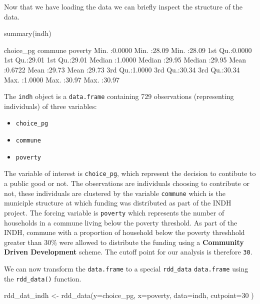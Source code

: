 \documentclass[article]{jss}
\begin{document}
Now that we have loading the data we can briefly inspect the structure
of the data.

\begin{CodeChunk}
\begin{CodeInput}
summary(indh)
\end{CodeInput}
\begin{CodeOutput}
   choice_pg         commune         poverty     
 Min.   :0.0000   Min.   :28.09   Min.   :28.09  
 1st Qu.:0.0000   1st Qu.:29.01   1st Qu.:29.01  
 Median :1.0000   Median :29.95   Median :29.95  
 Mean   :0.6722   Mean   :29.73   Mean   :29.73  
 3rd Qu.:1.0000   3rd Qu.:30.34   3rd Qu.:30.34  
 Max.   :1.0000   Max.   :30.97   Max.   :30.97  
\end{CodeOutput}
\end{CodeChunk}

The \texttt{indh} object is a \texttt{data.frame} containing 729
observations (representing individuals) of three variables:

\begin{itemize}
\itemsep1pt\parskip0pt
\item
  \texttt{choice\_pg}
\item
  \texttt{commune}
\item
  \texttt{poverty}
\end{itemize}

The variable of interest is \texttt{choice\_pg}, which represent the
decision to contibute to a public good or not. The observations are
individuals choosing to contribute or not, these individuals are
clustered by the variable \texttt{commune} which is the municiple
structure at which funding was distributed as part of the INDH project.
The forcing variable is \texttt{poverty} which represents the number of
households in a commune living below the poverty threshold. As part of
the INDH, commune with a proportion of household below the poverty
threshhold greater than 30\% were allowed to distribute the funding
using a \textbf{Community Driven Development} scheme. The cutoff point
for our analysis is therefore \texttt{30}.

We can now transform the \texttt{data.frame} to a special
\texttt{rdd\_data} \texttt{data.frame} using the \texttt{rdd\_data()}
function.

\begin{CodeChunk}
\begin{CodeInput}
rdd_dat_indh <- rdd_data(y=choice_pg,
                         x=poverty,
                         data=indh,
                         cutpoint=30 )
\end{CodeInput}
\end{CodeChunk}
\end{document}

